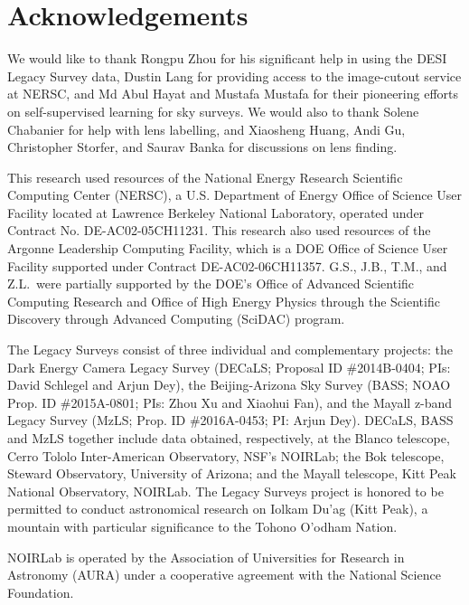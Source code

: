 \documentclass{aastex631}
\begin{document}
\section{Acknowledgements}
We would like to thank Rongpu Zhou for his significant help in using the DESI Legacy Survey data, Dustin Lang for providing access to the image-cutout service at NERSC, and Md Abul Hayat and Mustafa Mustafa for their pioneering efforts on self-supervised learning for sky surveys. We would also to thank Solene Chabanier for help with lens labelling, and Xiaosheng Huang, Andi Gu, Christopher Storfer, and Saurav Banka for discussions on lens finding.

This research used resources of the National Energy Research Scientific Computing Center (NERSC), a U.S. Department of Energy Office of Science User Facility located at Lawrence Berkeley National Laboratory, operated under Contract No. DE-AC02-05CH11231. This research also used resources of the Argonne Leadership Computing Facility, which is a DOE Office of Science User Facility supported under Contract DE-AC02-06CH11357. G.S., J.B., T.M., and Z.L.~were partially supported by the DOE's Office of Advanced Scientific Computing Research and Office of High Energy Physics through the Scientific Discovery through Advanced Computing (SciDAC) program.

The Legacy Surveys consist of three individual and complementary projects: the Dark Energy Camera Legacy Survey (DECaLS; Proposal ID \#2014B-0404; PIs: David Schlegel and Arjun Dey), the Beijing-Arizona Sky Survey (BASS; NOAO Prop. ID \#2015A-0801; PIs: Zhou Xu and Xiaohui Fan), and the Mayall z-band Legacy Survey (MzLS; Prop. ID \#2016A-0453; PI: Arjun Dey). DECaLS, BASS and MzLS together include data obtained, respectively, at the Blanco telescope, Cerro Tololo Inter-American Observatory, NSF’s NOIRLab; the Bok telescope, Steward Observatory, University of Arizona; and the Mayall telescope, Kitt Peak National Observatory, NOIRLab. The Legacy Surveys project is honored to be permitted to conduct astronomical research on Iolkam Du’ag (Kitt Peak), a mountain with particular significance to the Tohono O’odham Nation.

NOIRLab is operated by the Association of Universities for Research in Astronomy (AURA) under a cooperative agreement with the National Science Foundation.
\end{document}
